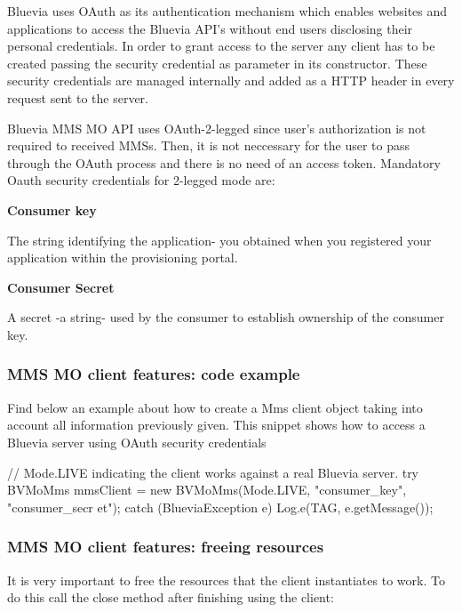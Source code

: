 Bluevia uses OAuth as its authentication mechanism which enables websites and applications to access the Bluevia API's without end users disclosing their personal credentials. In order to grant access to the server any client has to be created passing the security credential as parameter in its constructor. These security credentials are managed internally and added as a HTTP header in every request sent to the server.

Bluevia MMS MO API uses OAuth-\/2-\/legged since user's authorization is not required to received MMSs. Then, it is not neccessary for the user to pass through the OAuth process and there is no need of an access token. Mandatory Oauth security credentials for 2-\/legged mode are:


\begin{DoxyItemize}
\item {\bfseries Consumer key} \par
The string identifying the application-\/ you obtained when you registered your application within the provisioning portal.


\item {\bfseries Consumer Secret} \par
A secret -\/a string-\/ used by the consumer to establish ownership of the consumer key. 
\end{DoxyItemize}\hypertarget{blv_mms_mo_guide_mms_mo_client_features_code_examples_sec}{}\subsubsection{MMS MO client features: code example}\label{blv_mms_mo_guide_mms_mo_client_features_code_examples_sec}
Find below an example about how to create a Mms client object taking into account all information previously given. This snippet shows how to access a Bluevia server using OAuth security credentials


\begin{DoxyCode}
// Mode.LIVE indicating the client works against a real Bluevia server.
try {
        BVMoMms mmsClient = new BVMoMms(Mode.LIVE, "consumer_key", "consumer_secr
      et");
} catch (BlueviaException e){
        Log.e(TAG, e.getMessage());
}
\end{DoxyCode}
\hypertarget{blv_mms_mo_guide_mms_mo_client_features_freeing_resources_sec}{}\subsubsection{MMS MO client features: freeing resources}\label{blv_mms_mo_guide_mms_mo_client_features_freeing_resources_sec}
It is very important to free the resources that the client instantiates to work. To do this call the close method after finishing using the client:


